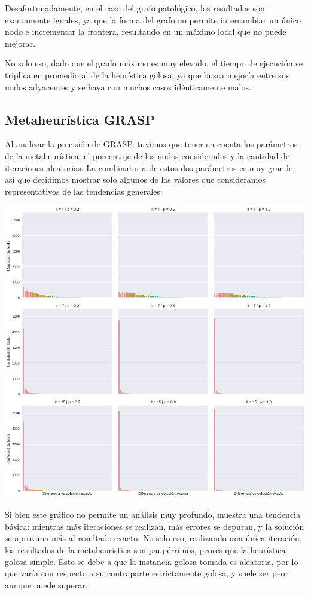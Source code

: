 Desafortunadamente, en el caso del grafo patológico, los resultados son exactamente iguales, ya que la forma del grafo no permite intercambiar un único nodo e incrementar la frontera, resultando en un máximo local que no puede mejorar.

No solo eso, dado que el grado máximo es muy elevado, el tiempo de ejecución se triplica en promedio al de la heurística golosa, ya que busca mejoría entre sus nodos adyacentes y se haya con muchos casos idénticamente malos.

\subsection{Metaheurística GRASP}

Al analizar la precisión de GRASP, tuvimos que tener en cuenta los parámetros de la metaheurística: el porcentaje de los nodos considerados y la cantidad de iteraciones aleatorias. La combinatoria de estos dos parámetros es muy grande, así que decidimos mostrar solo algunos de los valores que consideramos representativos de las tendencias generales:

\begin{center}
    \includegraphics[scale=0.6]{img/accuracy-grasp-3x3.png}
\end{center}

Si bien este gráfico no permite un análisis muy profundo, muestra una tendencia básica: mientras más iteraciones se realizan, más errores se depuran, y la solución se aproxima más al resultado exacto. No solo eso, realizando una única iteración, los resultados de la metaheurística son paupérrimos, peores que la heurística golosa simple. Esto se debe a que la instancia golosa tomada es aleatoria, por lo que varía con respecto a su contraparte estrictamente golosa, y suele ser peor aunque puede superar.

